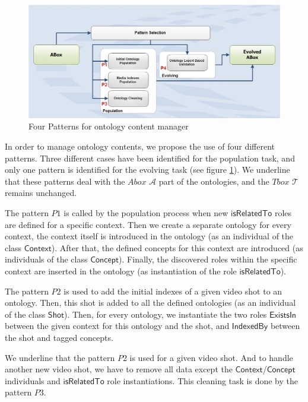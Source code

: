 		\begin{figure}[ht!]	
		\begin{center}
			\includegraphics[width=\textwidth]{graphics/patterns_2}
			\caption{Four Patterns for ontology content manager}
			\label{fig:patterns}
		\end{center}
		\end{figure}
		
		In order to manage ontology contents, we propose the use of four different patterns. 
		Three different cases have been identified for the population task, and only one pattern is identified 
		for the evolving task (see figure \ref{fig:patterns}). We underline that these patterns deal with the 
		$Abox$ $\mathcal{A}$ part of the ontologies, and the $Tbox$ $\mathcal{T}$ remains unchanged.
		
		The pattern $P1$ is called by the population process when new $\mathsf{isRelatedTo}$ 
		roles are defined for a specific context. Then we create a separate ontology for every context, 
		the context itself is introduced in the ontology (as an individual of the class $\mathsf{Context}$). 
		After that, the defined concepts for this context are introduced 
		(as individuals of the class $\mathsf{Concept}$). 
		Finally, the discovered roles within the specific context are inserted in the ontology (as instantiation of
		the role $\mathsf{isRelatedTo}$). 

		The pattern $P2$ is used to add the initial indexes of a given video shot to an ontology.
		Then, this shot is added to all the defined ontologies (as an individual of
		the class $\mathsf{Shot}$).
		Then, for every ontology, we instantiate the two roles $\mathsf{ExistsIn}$ between the given 
		context for this ontology and the shot, and $\mathsf{IndexedBy}$ between the shot and tagged concepts.
		
		
		We underline that the pattern $P2$ is used for a given video shot. And to handle another new video 
		shot, we have to remove all data except the $\mathsf{Context}$/$\mathsf{Concept}$ individuals and 
		$\mathsf{isRelatedTo}$ role instantiations. This cleaning task is done by the pattern $P3$.

